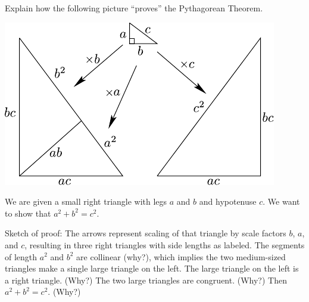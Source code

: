 \documentclass[nooutcomes]{ximera}
\begin{document}
\begin{question}
Explain how the following picture ``proves'' the Pythagorean Theorem.
\begin{image}
\includegraphics[scale=0.8]{pbpdilation.pdf}
\end{image}
\begin{freeResponse}
\begin{hint}
We are given a small right triangle with legs $a$ and $b$ and hypotenuse $c$.  We want to show that $a^2 + b^2 = c^2$.  

Sketch of proof:  The arrows represent scaling of that triangle by scale factors $b$, $a$, and $c$, resulting in three right triangles with side lengths as labeled.  The segments of length $a^2$ and $b^2$ are collinear (why?), which implies the two medium-sized triangles make a single large triangle on the left.  The large triangle on the left is a right triangle.  (Why?)  The two large triangles are congruent.  (Why?)  Then $a^2 + b^2 = c^2$.  (Why?)
\end{hint}
\end{freeResponse}
\end{question}
\end{document}
